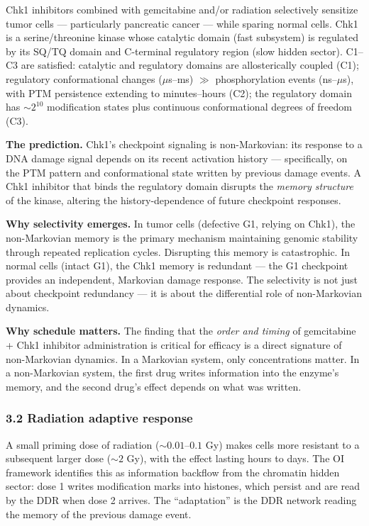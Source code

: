 \documentclass[
]{article}
\begin{document}
Chk1 inhibitors combined with gemcitabine and/or radiation selectively
sensitize tumor cells --- particularly pancreatic cancer --- while
sparing normal cells. Chk1 is a serine/threonine kinase whose catalytic
domain (fast subsystem) is regulated by its SQ/TQ domain and C-terminal
regulatory region (slow hidden sector). C1--C3 are satisfied: catalytic
and regulatory domains are allosterically coupled (C1); regulatory
conformational changes (\(\mu\)s--ms) \(\gg\) phosphorylation events
(ns--\(\mu\)s), with PTM persistence extending to minutes--hours (C2);
the regulatory domain has \(\sim 2^{10}\) modification states plus
continuous conformational degrees of freedom (C3).

\textbf{The prediction.} Chk1's checkpoint signaling is non-Markovian:
its response to a DNA damage signal depends on its recent activation
history --- specifically, on the PTM pattern and conformational state
written by previous damage events. A Chk1 inhibitor that binds the
regulatory domain disrupts the \emph{memory structure} of the kinase,
altering the history-dependence of future checkpoint responses.

\textbf{Why selectivity emerges.} In tumor cells (defective G1, relying
on Chk1), the non-Markovian memory is the primary mechanism maintaining
genomic stability through repeated replication cycles. Disrupting this
memory is catastrophic. In normal cells (intact G1), the Chk1 memory is
redundant --- the G1 checkpoint provides an independent, Markovian
damage response. The selectivity is not just about checkpoint redundancy
--- it is about the differential role of non-Markovian dynamics.

\textbf{Why schedule matters.} The finding that the \emph{order and
timing} of gemcitabine + Chk1 inhibitor administration is critical for
efficacy is a direct signature of non-Markovian dynamics. In a Markovian
system, only concentrations matter. In a non-Markovian system, the first
drug writes information into the enzyme's memory, and the second drug's
effect depends on what was written.

\hypertarget{radiation-adaptive-response}{%
\subsubsection{3.2 Radiation adaptive
response}\label{radiation-adaptive-response}}

A small priming dose of radiation (\(\sim 0.01\)--\(0.1\) Gy) makes
cells more resistant to a subsequent larger dose (\(\sim 2\) Gy), with
the effect lasting hours to days. The OI framework identifies this as
information backflow from the chromatin hidden sector: dose 1 writes
modification marks into histones, which persist and are read by the DDR
when dose 2 arrives. The ``adaptation'' is the DDR network reading the
memory of the previous damage event.
\end{document}
